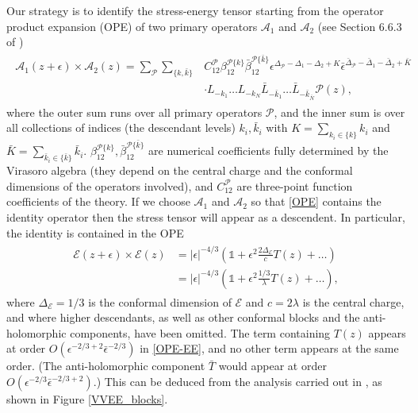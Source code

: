 \documentclass[a4paper,11pt]{article}
\begin{document}
Our strategy is to identify the stress-energy tensor starting from the operator product expansion (OPE) of two primary operators $\mathcal{A}_1$ and $\mathcal{A}_2$ (see Section 6.6.3 of \cite{DiFrancesco:639405})
\begin{align}
\begin{split} \label{OPE}
    \mathcal{A}_1(z+\epsilon) \times \mathcal{A}_2(z) = \sum_\mathcal{P} \sum_{\{k,\bar{k}\}} & C^\mathcal{P}_{12} \beta^{\mathcal{P}\{k\}}_{12} \bar{\beta}^{\mathcal{P}\{\bar{k}\}}_{12} \epsilon^{\Delta_\mathcal{P} - \Delta_1 - \Delta_2 + K} \bar{\epsilon}^{\bar{\Delta}_\mathcal{P} - \bar{\Delta}_1 - \bar{\Delta}_2 + \bar{K}} \\
    & \cdot L_{-k_1}\ldots L_{-k_N} \bar{L}_{-\bar{k}_1}\ldots \bar{L}_{-\bar{k}_{\bar{N}}} \mathcal{P}(z),
\end{split}
\end{align}
where the outer sum runs over all primary operators $\mathcal{P}$, and the inner sum is over all collections of indices (the descendant levels)
$k_i, \bar{k}_i$ with 
$K=\sum_{k_i \in \{k\}} k_i$ and $\bar{K}=\sum_{\bar{k}_i \in \{\bar{k}\}} \bar{k}_i$.
$\beta_{1 2}^{\mathcal{P}\{k\}}, \bar{\beta}_{1 2}^{\mathcal{P}\{\bar{k}\}}$ are numerical coefficients fully determined by the Virasoro algebra (they depend on the central charge and the conformal dimensions of the operators involved),
and $C_{1 2}^\mathcal{P}$ are three-point function coefficients of the theory.
If we choose $\mathcal{A}_1$ and $\mathcal{A}_2$ so that \eqref{OPE} contains the identity operator then the stress tensor will appear as a descendent. In particular, the identity is contained in the OPE
\begin{align}
\begin{split} \label{OPE-EE}
    \mathcal{E}(z+\epsilon) \times \mathcal{E}(z) & = |\epsilon|^{-4/3} \left( \mathbb{1} +
    \epsilon^2 \frac{2\Delta_{\mathcal{E}}}{c}T(z) + \ldots
    \right) \\
    & = |\epsilon|^{-4/3} \left( \mathbb{1} +
    \epsilon^2 \frac{1/3}{\lambda}T(z) + \ldots
    \right),
\end{split}
\end{align}
where $\Delta_{\mathcal{E}}=1/3$ is the conformal dimension of $\mathcal{E}$ and $c=2\lambda$ is the central charge, and where higher descendants, as well as other conformal blocks and the anti-holomorphic components, have been omitted. The term containing $T(z)$ appears at order $O(\epsilon^{-2/3 + 2} \bar{\epsilon}^{-2/3})$ in \eqref{OPE-EE}, and no other term appears at the same order. (The anti-holomorphic component $\bar{T}$ would appear at order $O(\epsilon^{-2/3} \bar{\epsilon}^{-2/3+2})$.) This can be deduced from the analysis carried out in \cite{Camia_2020}, as shown in Figure \ref{VVEE_blocks}.
\end{document}
